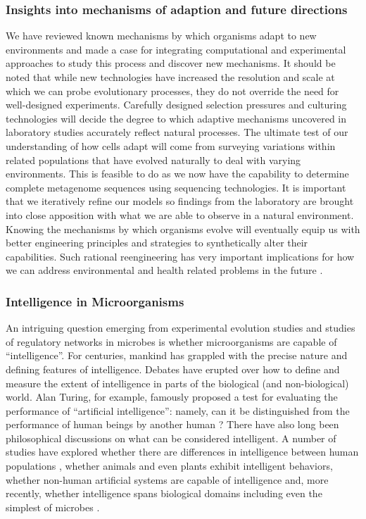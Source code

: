 \subsubsection{Insights into mechanisms of adaption and future directions} 

We have reviewed known mechanisms by which organisms adapt to new environments and made a case for integrating computational and experimental approaches to study this process and discover new mechanisms. It should be noted that while new technologies have increased the resolution and scale at which we can probe evolutionary processes, they do not override the need for well-designed experiments. Carefully designed selection pressures and culturing technologies will decide the degree to which adaptive mechanisms uncovered in laboratory studies accurately reflect natural processes. The ultimate test of our understanding of how cells adapt will come from surveying variations within related populations that have evolved naturally to deal with varying environments. This is feasible to do as we now have the capability to determine complete metagenome sequences using sequencing technologies. It is important that we iteratively refine our models so findings from the laboratory are brought into close apposition with what we are able to observe in a natural environment. Knowing the mechanisms by which organisms evolve will eventually equip us with better engineering principles and strategies to synthetically alter their capabilities. Such rational reengineering has very important implications for how we can address environmental and health related problems in the future \cite{koide_role_2009}.  

\subsubsection{Intelligence in Microorganisms}

An intriguing question emerging from experimental evolution studies and studies of regulatory networks in microbes is whether microorganisms are capable of ``intelligence''. For centuries, mankind has grappled with the precise nature and defining features of intelligence. Debates have erupted over how to define and measure the extent of intelligence in parts of the biological (and non-biological) world. Alan Turing, for example, famously proposed a test for evaluating the performance of ``artificial intelligence'': namely, can it be distinguished from the performance of human beings by another human \cite{turing_computing_1950}? There have also long been philosophical discussions on what can be considered intelligent. A number of studies have explored whether there are differences in intelligence between human populations \cite{neisser_intelligence:_1996}, whether animals \cite{thorndike_animal_1998} and even plants \cite{trewavas_mindless_2002} exhibit intelligent behaviors, whether non-human artificial systems are capable of intelligence \cite{brooks_intelligence_1991} and, more recently, whether intelligence spans biological domains including even the simplest of microbes \cite{hellingwerf_signal_1995,bruggeman_macromolecular_2000,hoffer_autoamplification_2001,ben_jacob_bacterial_2004}. 

